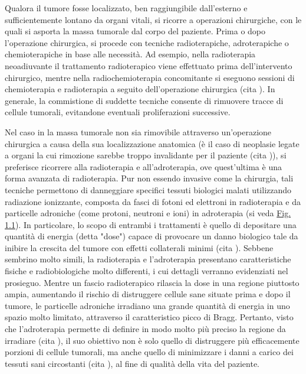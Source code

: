 \documentclass[12pt,a4paper,twoside]{report}
\begin{document}
	Qualora il tumore fosse localizzato, ben raggiungibile dall'esterno e sufficientemente lontano da organi vitali, si ricorre a operazioni chirurgiche, con le quali si asporta la massa tumorale dal corpo del paziente. Prima o dopo l'operazione chirurgica, si procede con tecniche radioterapiche, adroterapiche o chemioterapiche in base alle necessità. Ad esempio, nella radioterapia neoadiuvante il trattamento radioterapico viene effettuato prima dell'intervento chirurgico, mentre nella radiochemioterapia concomitante si eseguono sessioni di chemioterapia e radioterapia a seguito dell'operazione chirurgica (cita
	). In generale, la commistione di suddette tecniche consente di rimuovere tracce di cellule tumorali, evitandone eventuali proliferazioni successive.
	
	Nel caso in la massa tumorale non sia rimovibile attraverso un'operazione chirurgica a causa della sua localizzazione anatomica (è il caso di neoplasie legate a organi la cui rimozione sarebbe troppo invalidante per il paziente (cita
	)), si preferisce ricorrere alla radioterapia e all'adroterapia, ove quest'ultima è una forma avanzata di radioterapia. Pur non essendo invasive come la chirurgia, tali tecniche permettono di danneggiare specifici tessuti biologici malati utilizzando radiazione ionizzante, composta da fasci di fotoni ed elettroni in radioterapia e da particelle adroniche (come protoni, neutroni e ioni) in adroterapia (si veda \hyperref[fig:simulation]{Fig. 1.1}). In particolare, lo scopo di entrambi i trattamenti è quello di depositare una quantità di energia (detta "dose") capace di provocare un danno biologico tale da inibire la crescita del tumore con effetti collaterali minimi (cita
	). Sebbene sembrino molto simili, la radioterapia e l'adroterapia presentano caratteristiche fisiche e radiobiologiche molto differenti, i cui dettagli verranno evidenziati nel prosieguo. Mentre un fascio radioterapico rilascia la dose in una regione piuttosto ampia, aumentando il rischio di distruggere cellule sane situate prima e dopo il tumore, le particelle adroniche irradiano una grande quantità di energia in uno spazio molto limitato, attraverso il caratteristico picco di Bragg. Pertanto, visto che l'adroterapia permette di definire in modo molto più preciso la regione da irradiare (cita
	), il suo obiettivo non è solo quello di distruggere più efficacemente porzioni di cellule tumorali, ma anche quello di minimizzare i danni a carico dei tessuti sani circostanti (cita
	), al fine di qualità della vita del paziente.
	
\end{document}
